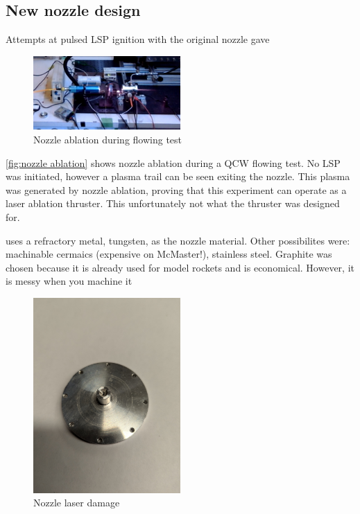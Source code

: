    \subsection{New nozzle design}

    Attempts at pulsed LSP ignition with the original nozzle gave 

    \begin{figure}[!ht]
        \centering
        \includegraphics[width=0.5\textwidth]{assets/5 discussion/Nozzle ablation.png}
        \caption{Nozzle ablation during flowing test}
        \label{fig:nozzle ablation}
    \end{figure}

    \autoref{fig:nozzle ablation} shows nozzle ablation during a QCW flowing test. No LSP was initiated, however a plasma trail can be seen exiting the nozzle. This plasma was generated by nozzle ablation, proving that this experiment can operate as a laser ablation thruster. This unfortunately not what the thruster was designed for. 

    \textcite{toyodaThrustPerformanceCW2002} uses a refractory metal, tungsten, as the nozzle material. Other possibilites were: machinable cermaics (expensive on McMaster!), stainless steel. Graphite was chosen because it is already used for model rockets and is economical. However, it is messy when you machine it 

    \begin{figure}[!ht]
        \centering
        \includegraphics[width=0.5\textwidth]{assets/4 experiments/Nozzle damage.jpg}
        \caption{Nozzle laser damage}
    \end{figure}

